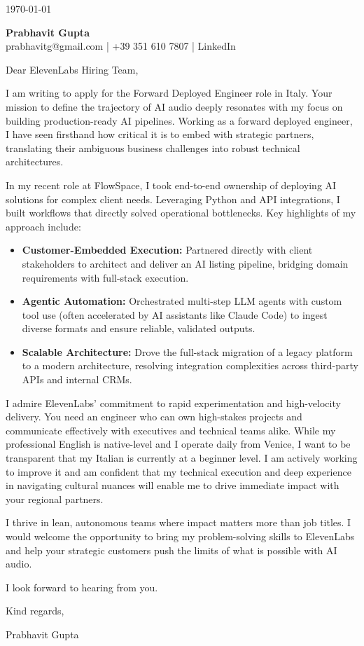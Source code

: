 \documentclass[11pt,a4paper]{article}
\begin{document}
\begin{flushright}
\today
\end{flushright}

\textbf{Prabhavit Gupta}\\
prabhavitg@gmail.com | +39 351 610 7807 | LinkedIn

Dear ElevenLabs Hiring Team,

I am writing to apply for the Forward Deployed Engineer role in Italy. Your mission to define the trajectory of AI audio deeply resonates with my focus on building production-ready AI pipelines. Working as a forward deployed engineer, I have seen firsthand how critical it is to embed with strategic partners, translating their ambiguous business challenges into robust technical architectures.

In my recent role at FlowSpace, I took end-to-end ownership of deploying AI solutions for complex client needs. Leveraging Python and API integrations, I built workflows that directly solved operational bottlenecks. Key highlights of my approach include:

\begin{itemize}
    \item \textbf{Customer-Embedded Execution:} Partnered directly with client stakeholders to architect and deliver an AI listing pipeline, bridging domain requirements with full-stack execution.
    \item \textbf{Agentic Automation:} Orchestrated multi-step LLM agents with custom tool use (often accelerated by AI assistants like Claude Code) to ingest diverse formats and ensure reliable, validated outputs.
    \item \textbf{Scalable Architecture:} Drove the full-stack migration of a legacy platform to a modern architecture, resolving integration complexities across third-party APIs and internal CRMs.
\end{itemize}

I admire ElevenLabs' commitment to rapid experimentation and high-velocity delivery. You need an engineer who can own high-stakes projects and communicate effectively with executives and technical teams alike. While my professional English is native-level and I operate daily from Venice, I want to be transparent that my Italian is currently at a beginner level. I am actively working to improve it and am confident that my technical execution and deep experience in navigating cultural nuances will enable me to drive immediate impact with your regional partners.

I thrive in lean, autonomous teams where impact matters more than job titles. I would welcome the opportunity to bring my problem-solving skills to ElevenLabs and help your strategic customers push the limits of what is possible with AI audio.

I look forward to hearing from you.

\vspace{1em}
Kind regards,

Prabhavit Gupta
\end{document}
